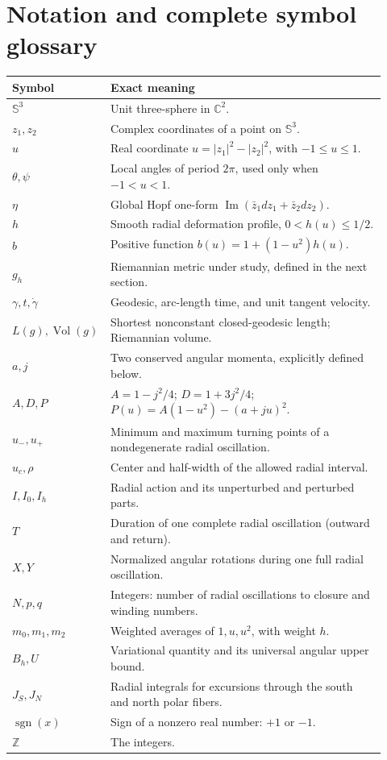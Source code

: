 \documentclass[11pt,a4paper]{article}
\theoremstyle{remark}\newtheorem{remark}[theorem]{Remark}
\newcommand{\Sthree}{\mathbb S^3}\newcommand{\R}{\mathbb R}\newcommand{\C}{\mathbb C}\newcommand{\Z}{\mathbb Z}
\newcommand{\Vol}{\operatorname{Vol}}\newcommand{\Len}{\operatorname{Length}}\newcommand{\sgn}{\operatorname{sgn}}
\begin{document}
\section{Notation and complete symbol glossary}
\begin{longtable}{p{0.19\linewidth}p{0.73\linewidth}}
\toprule
Symbol & Exact meaning \\
\midrule
$\Sthree$ & Unit three-sphere in $\C^2$.\\
$z_1,z_2$ & Complex coordinates of a point on $\Sthree$.\\
$u$ & Real coordinate $u=|z_1|^2-|z_2|^2$, with $-1\leq u\leq1$.\\
$\theta,\psi$ & Local angles of period $2\pi$, used only when $-1<u<1$.\\
$\eta$ & Global Hopf one-form $\operatorname{Im}(\bar z_1dz_1+\bar z_2dz_2)$.\\
$h$ & Smooth radial deformation profile, $0<h(u)\leq1/2$.\\
$b$ & Positive function $b(u)=1+(1-u^2)h(u)$.\\
$g_h$ & Riemannian metric under study, defined in the next section.\\
$\gamma,t,\dot\gamma$ & Geodesic, arc-length time, and unit tangent velocity.\\
$L(g),\Vol(g)$ & Shortest nonconstant closed-geodesic length; Riemannian volume.\\
$a,j$ & Two conserved angular momenta, explicitly defined below.\\
$A,D,P$ & $A=1-j^2/4$; $D=1+3j^2/4$; $P(u)=A(1-u^2)-(a+ju)^2$.\\
$u_-,u_+$ & Minimum and maximum turning points of a nondegenerate radial oscillation.\\
$u_c,\rho$ & Center and half-width of the allowed radial interval.\\
$I,I_0,I_h$ & Radial action and its unperturbed and perturbed parts.\\
$T$ & Duration of one complete radial oscillation (outward and return).\\
$X,Y$ & Normalized angular rotations during one full radial oscillation.\\
$N,p,q$ & Integers: number of radial oscillations to closure and winding numbers.\\
$m_0,m_1,m_2$ & Weighted averages of $1,u,u^2$, with weight $h$.\\
$B_h,U$ & Variational quantity and its universal angular upper bound.\\
$J_S,J_N$ & Radial integrals for excursions through the south and north polar fibers.\\
$\sgn(x)$ & Sign of a nonzero real number: $+1$ or $-1$.\\
$\Z$ & The integers.\\
\bottomrule
\end{longtable}
\end{document}
